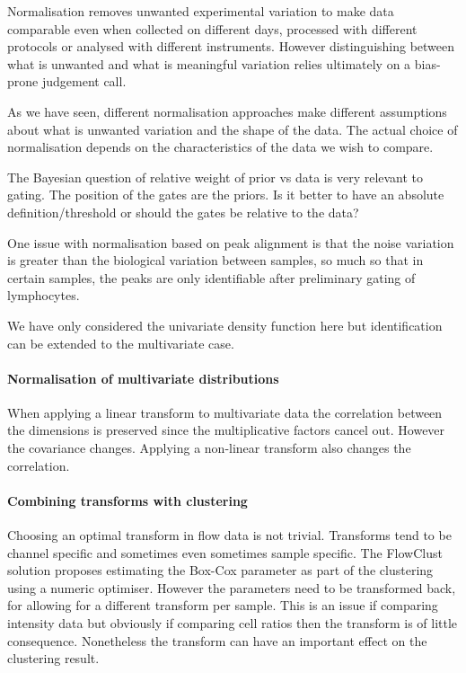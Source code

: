 Normalisation removes unwanted experimental variation to make data comparable even when collected on different days,
processed with different protocols or analysed with different instruments.
However distinguishing between what is unwanted and what is meaningful variation relies ultimately on a bias-prone judgement call.

As we have seen, different normalisation approaches make different assumptions about what is unwanted variation and the shape of the data.
The actual choice of normalisation depends on the characteristics of the data we wish to compare.

The Bayesian question of relative weight of prior vs data is very relevant to gating.
The position of the gates are the priors. Is it better to have an absolute definition/threshold or should the gates be relative to the data?
 
One issue with normalisation based on peak alignment is that the noise variation is greater than the biological variation between samples, so much so that in certain samples, the peaks are only identifiable after preliminary gating of lymphocytes.

We have only considered the univariate density function here but identification can be extended to the multivariate case.

\paragraph{Normalisation of multivariate distributions}

When applying a linear transform to multivariate data the correlation between the dimensions is preserved since the multiplicative factors cancel out.
However the covariance changes.
Applying a non-linear transform also changes the correlation.

\paragraph{Combining transforms with clustering}

Choosing an optimal transform in flow data is not trivial.
Transforms tend to be channel specific and sometimes even sometimes sample specific.
The FlowClust solution proposes estimating the Box-Cox parameter as part of the clustering using a numeric optimiser.
However the parameters need to be transformed back, for allowing for a different transform per sample.
This is an issue if comparing intensity data but obviously if comparing cell ratios then the transform is of little consequence.
Nonetheless the transform can have an important effect on the clustering result.


